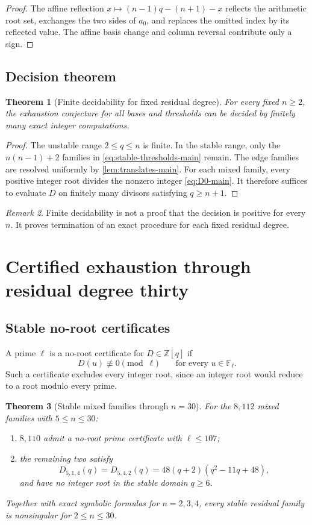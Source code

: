 \documentclass[11pt]{amsart}
\newcommand{\Z}{\mathbb Z}
\newcommand{\F}{\mathbb F}
\newcommand{\1}{\mathbf 1}
\newtheorem{theorem}{Theorem}[section]
\theoremstyle{remark}
\newtheorem{remark}[theorem]{Remark}
\begin{document}
\begin{proof}
The affine reflection $x\mapsto(n-1)q-(n+1)-x$ reflects the arithmetic root set, exchanges the two sides of $a_0$, and replaces the omitted index by its reflected value. The affine basis change and column reversal contribute only a sign.
\end{proof}

\subsection{Decision theorem}
\begin{theorem}[Finite decidability for fixed residual degree]\label{thm:decidable-main}
For every fixed $n\ge2$, the exhaustion conjecture for all bases and thresholds can be decided by finitely many exact integer computations.
\end{theorem}

\begin{proof}
The unstable range $2\le q\le n$ is finite. In the stable range, only the $n(n-1)+2$ families in \eqref{eq:stable-thresholds-main} remain. The edge families are resolved uniformly by \cref{lem:translates-main}. For each mixed family, every positive integer root divides the nonzero integer \eqref{eq:D0-main}. It therefore suffices to evaluate $D$ on finitely many divisors satisfying $q\ge n+1$.
\end{proof}

\begin{remark}
Finite decidability is not a proof that the decision is positive for every $n$. It proves termination of an exact procedure for each fixed residual degree.
\end{remark}

\section{Certified exhaustion through residual degree thirty}
\label{sec:certification}

\subsection{Stable no-root certificates}
A prime $\ell$ is a no-root certificate for $D\in\Z[q]$ if
\[
 D(u)\not\equiv0\pmod\ell
 \qquad\text{for every }u\in\F_\ell.
\]
Such a certificate excludes every integer root, since an integer root would reduce to a root modulo every prime.

\begin{theorem}[Stable mixed families through $n=30$]\label{thm:stable-certs-main}
For the $8{,}112$ mixed families with $5\le n\le30$:
\begin{enumerate}[label=(\roman*)]
\item $8{,}110$ admit a no-root prime certificate with $\ell\le107$;
\item the remaining two satisfy
\[
 D_{5,1,4}(q)=D_{5,4,2}(q)=48(q+2)(q^2-11q+48),
\]
and have no integer root in the stable domain $q\ge6$.
\end{enumerate}
Together with exact symbolic formulas for $n=2,3,4$, every stable residual family is nonsingular for $2\le n\le30$.
\end{theorem}
\end{document}
